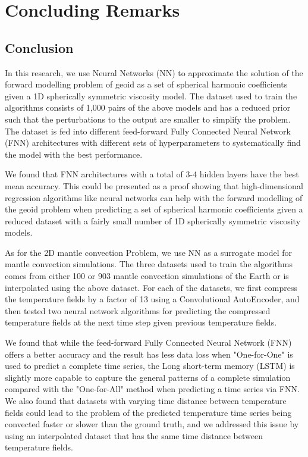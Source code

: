\chapter{Concluding Remarks}\label{chap:conclusion}

\section{Conclusion}

In this research, we use Neural Networks (NN) to approximate the solution of the forward modelling problem of geoid as a set of spherical harmonic coefficients given a 1D spherically symmetric viscosity model. The dataset used to train the algorithms consists of 1,000 pairs of the above models and has a reduced prior such that the perturbations to the output are smaller to simplify the problem. The dataset is fed into different feed-forward Fully Connected Neural Network (FNN) architectures with different sets of hyperparameters to systematically find the model with the best performance. 

We found that FNN architectures with a total of 3-4 hidden layers have the best mean accuracy. This could be presented as a proof showing that high-dimensional regression algorithms like neural networks can help with the forward modelling of the geoid problem when predicting a set of spherical harmonic coefficients given a reduced dataset with a fairly small number of 1D spherically symmetric viscosity models.

As for the 2D mantle convection Problem, we use NN as a surrogate model for mantle convection simulations. The three datasets used to train the algorithms comes from either 100 or 903 mantle convection simulations of the Earth or is interpolated using the above dataset. For each of the datasets, we first compress the temperature fields by a factor of 13 using a Convolutional AutoEncoder, and then tested two neural network algorithms for predicting the compressed temperature fields at the next time step given previous temperature fields. 

We found that while the feed-forward Fully Connected Neural Network (FNN) offers a better accuracy and the result has less data loss when "One-for-One" is used to predict a complete time series, the Long short-term memory (LSTM) is slightly more capable to capture the general patterns of a complete simulation compared with the "One-for-All" method when predicting a time series via FNN. We also found that datasets with varying time distance between temperature fields could lead to the problem of the predicted temperature time series being convected faster or slower than the ground truth, and we addressed this issue by using an interpolated dataset that has the same time distance between temperature fields.

